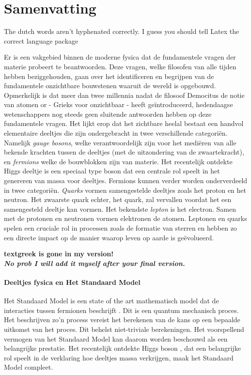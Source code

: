 \chapter*{Samenvatting}

{\color{red} The dutch words aren't hyphenated correctly. I guess you should tell Latex the correct language package}

Er is een vakgebied binnen de moderne fysica dat de fundamentele vragen der materie probeert te beantwoorden. Deze vragen, welke filosofen van alle tijden hebben beziggehouden, gaan over het identificeren en begrijpen van de fundamentele onzichtbare bouwstenen waaruit de wereld is opgebouwd. Opmerkelijk is dat meer dan twee millennia nadat de filosoof Democitus de notie van atomen or \textgreek{} - Grieks voor onzichtbaar -  heeft ge\"introduceerd, hedendaagse wetenschappers nog steeds geen sluitende antwoorden hebben op deze fundamentele vragen. Het lijkt erop dat het zichtbare heelal bestaat een handvol elementaire deeltjes die zijn ondergebracht in twee verschillende categori\"en. Namelijk {\it gauge bosons}, welke verantwoordelijk zijn voor het medi\"eren van alle bekende krachten tussen de deeltjes (met de uitzondering van de zwaartekracht), en {\it fermions} welke de bouwblokken zijn van materie. Het recentelijk ontdekte Higgs deeltje \cite{higgs-cms,higgs-atlas} is een speciaal type boson dat een centrale rol speelt in het genereren van massa voor deeltjes. Fermions kunnen verder worden onderverdeeld in twee categori\"en. {\it Quarks} vormen samengestelde deeltjes zoals het proton en het neutron. Het zwaarste quark echter, het \tquark quark, zal vervallen voordat het een samengesteld deeltje kan vormen. Het bekendste {\it lepton} is het electron. Samen met de protonen en neutronen vormen elektronen de atomen. Leptonen en quarks spelen een cruciale rol in processen zoals de formatie van sterren en hebben zo een directe impact op de manier waarop leven op aarde is ge\"evolueerd.

\textbf{ \color{red} textgreek is gone in my version!}\\
\textbf{ \color{green} \it No prob I will add it myself after your final version.}\\




\subsubsection{Deeltjes fysica en Het Standaard Model}
Het Standaard Model is een state of the art mathematisch model dat de interacties tussen fermionen beschrijft \cite{sm-glashow,sm-weinberg,sm-salam}. Dit is een quantum mechanisch proces. Het beschrijven zo'n process vereist het berekenen van de kans op een bepaalde uitkomst van het proces. Dit behelst niet-triviale berekeningen. Het voorspellend vermogen van het Standaard Model kan daarom worden beschouwd als een belangrijke prestatie. Het recentelijk ontdekte Higgs boson \cite{higgs-cms,higgs-atlas}, dat een belangrijke rol speelt in de verklaring hoe deeltjes massa verkrijgen, maak het Standaard Model compleet.


